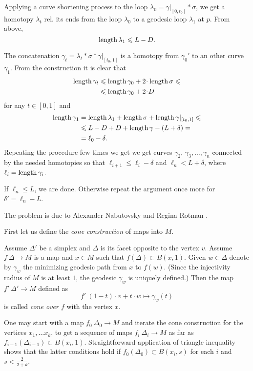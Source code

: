 Applying a curve shortening process to the loop $\lambda_0=\gamma|_{[0,t_0]}*\sigma$, 
we get a  homotopy $\lambda_t$
rel. its ends 
from the loop $\lambda_0$ to a geodesic loop $\lambda_1$ at $p$.
From above, 
\[\operatorname{\rm length}\lambda_1\leqslant L-D.\]

The concatenation $\gamma_t=\lambda_t*\bar\sigma*\gamma|_{[t_0,1]}$
is a homotopy
from $\gamma_0'$ to an other curve $\gamma_1$.
From the construction it is clear that 
\begin{align*}
 \length \gamma_t&\le \length \gamma_0+2\cdot \length\sigma\le
 \\
 &\le \length \gamma_0+2\cdot D
\end{align*}
for any $t\in[0,1]$
and 
\begin{align*}
 \operatorname{\rm length} \gamma_1&=\operatorname{\rm length}\lambda_1+\operatorname{\rm length}\sigma+\operatorname{\rm length}\gamma|_{[t_0,1]}\leqslant
\\ &\leqslant L-D+D+\operatorname{\rm length}\gamma-(L+\delta)=
\\ &=\ell_0 -\delta.
\end{align*}
Repeating the procedure few times we get we get curves $\gamma_2$, $\gamma_3,\dots,\gamma_n$
connected by the needed homotopies so that 
$\ell_{i+1}\le\ell_i-\delta$ and $\ell_n< L+\delta$,
where $\ell_i=\operatorname{\rm length}\gamma_i$.

If $\ell_n\le L$, we are done.
Otherwise repeat the argument once more for $\delta'=\ell_n-L$.
\qeds

The problem is due to 
Alexander Nabutovsky 
and Regina Rotman \cite[see][]{nabutovsky-rotman}.


First let us define the {}\emph{cone construction} of maps into $M$.

Assume $\Delta'$ be a simplex and $\Delta$ is its facet opposite to the vertex $v$.
Assume $f\:\Delta\to M$ is a map and $x\in M$ such that $f(\Delta)\subset B(x,1)$.
Given $w\in \Delta$ denote by $\gamma_w$ the minimizing geodesic path from $x$ to  $f(w)$.
(Since the injectivity radius of $M$ is at least $1$, the geodesic $\gamma_w$ is uniquely defined.)
Then the map $f'\:\Delta'\to M$ defined as 
\[f'\:(1-t)\cdot v+t\cdot w\mapsto \gamma_w(t)\] 
is called {}\emph{cone over $f$} with the vertex $x$. 

One may start with a map $f_0\:\Delta_0\to M$ and iterate the cone construction for the vertices $x_1,\dots x_k$,
to get a sequence of maps $f_i\:\Delta_i\to M$
as far as $f_{i-1}(\Delta_{i-1})\subset B(x_i,1)$.
Straightforward application of triangle inequality 
shows that the latter conditions hold if 
$f_0(\Delta_0)\subset B(x_i,s)$ for each $i$ and $s<\tfrac2{2+k}$.

